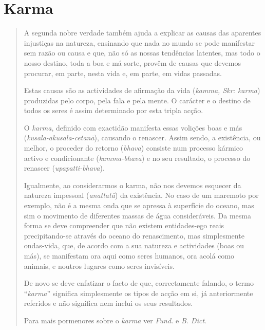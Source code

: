 \section{Karma}

\begin{quote}
  A segunda nobre verdade também ajuda a explicar as causas das aparentes
  injustiças na natureza, ensinando que nada no mundo se pode manifestar sem
  razão ou causa e que, não só as nossas tendências latentes, mas todo o nosso
  destino, toda a boa e má sorte, provêm de causas que devemos procurar, em
  parte, nesta vida e, em parte, em vidas passadas.

  Estas causas são as actividades de afirmação da vida (\emph{kamma, Skr:
    karma}) produzidas pelo corpo, pela fala e pela mente. O carácter e o
  destino de todos os seres é assim determinado por esta tripla acção.

  O \emph{karma}, definido com exactidão manifesta essas volições boas e más
  (\emph{kusala-akusala-cetanā}), causando o renascer. Assim sendo, a
  existência, ou melhor, o proceder do retorno (\emph{bhava}) consiste num
  processo kármico activo e condicionante (\emph{kamma-bhava}) e no seu
  resultado, o processo do renascer (\emph{upapatti-bhava}).

  Igualmente, ao considerarmos o karma, não nos devemos esquecer da natureza
  impessoal (\emph{anattatā}) da existência. No caso de um maremoto por exemplo,
  não é a mesma onda que se apressa à superfície do oceano, mas sim o movimento
  de diferentes massas de água consideráveis. Da mesma forma se deve compreender
  que não existem entidades-ego reais precipitando-se através do oceano do
  renascimento, mas simplesmente ondas-vida, que, de acordo com a sua natureza e
  actividades (boas ou más), se manifestam ora aqui como seres humanos, ora
  acolá como animais, e noutros lugares como seres invisíveis.

  De novo se deve enfatizar o facto de que, correctamente falando, o termo
  ``\emph{karma}'' significa simplesmente os tipos de acção em si, já
  anteriormente referidos e não significa nem inclui os seus resultados.

  Para mais pormenores sobre o \emph{karma} ver \emph{Fund.} e \emph{B. Dict}.
\end{quote}
